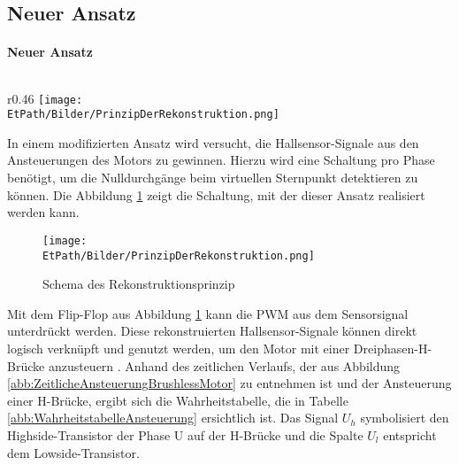     \subsection{Neuer Ansatz}
\fi
\ifEMBED
    \paragraph{Neuer Ansatz}$~~$\\
\fi
    \ifEMBED
        \begin{wrapfigure}{r}{0.46\textwidth}
            \texttt{[image: \\EtPath/Bilder/PrinzipDerRekonstruktion.png]}
            \centering
            \caption[Schema des Rekonstruktionsprinzip]{Schema des Rekonstruktionsprinzip \cite{HSLU:Pluess}}
            \label{abb:PrinzipRekonstruktion}
        \end{wrapfigure}
    \fi
        In einem modifizierten Ansatz wird versucht, die Hallsensor-Signale 
        aus den Ansteuerungen des Motors zu gewinnen. Hierzu wird 
        eine Schaltung pro Phase benötigt, um die Nulldurchgänge beim 
        virtuellen Sternpunkt detektieren zu können. Die Abbildung 
        \ref{abb:PrinzipRekonstruktion} zeigt die Schaltung, mit der dieser Ansatz 
        realisiert werden kann. 
    \ifSTANDALONE
    	\begin{figure}[h!]
            \centering
            \texttt{[image: \\EtPath/Bilder/PrinzipDerRekonstruktion.png]}
           	\caption{Schema des Rekonstruktionsprinzip \protect\cite{HSLU:Pluess}}
            \label{abb:PrinzipRekonstruktion}
        \end{figure}
    \fi
        Mit dem Flip-Flop aus Abbildung \ref{abb:PrinzipRekonstruktion} kann die PWM aus dem 
        Sensorsignal unterdrückt werden. Diese rekonstruierten 
        Hallsensor-Signale können direkt logisch verknüpft und genutzt 
        werden, um den Motor mit einer Dreiphasen-H-Brücke anzusteuern 
        \cite{HSLU:Pluess}. Anhand des zeitlichen Verlaufs, der aus Abbildung 
        \ref{abb:ZeitlicheAnsteuerungBrushlessMotor} zu entnehmen ist und der 
        Ansteuerung einer H-Brücke, ergibt sich die Wahrheitstabelle, die in 
        Tabelle \ref{abb:WahrheitstabelleAnsteuerung} ersichtlich ist. Das 
        Signal $U_h$ symbolisiert den Highside-Transistor der Phase U auf der 
        H-Brücke und die Spalte $U_l$ entspricht dem Lowside-Transistor.\\      
        
